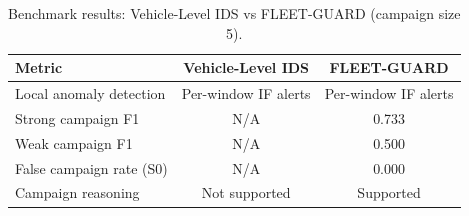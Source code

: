 \begin{table}[t]
\centering
\caption{Benchmark results: Vehicle-Level IDS vs FLEET-GUARD (campaign size 5).}
\label{tab:benchmark_results_summary}
\begin{tabular}{lcc}
\toprule
Metric & Vehicle-Level IDS & FLEET-GUARD \\
\midrule
Local anomaly detection & Per-window IF alerts & Per-window IF alerts \\
Strong campaign F1 & N/A & 0.733 \\
Weak campaign F1 & N/A & 0.500 \\
False campaign rate (S0) & N/A & 0.000 \\
Campaign reasoning & Not supported & Supported \\
\bottomrule
\end{tabular}
\end{table}
